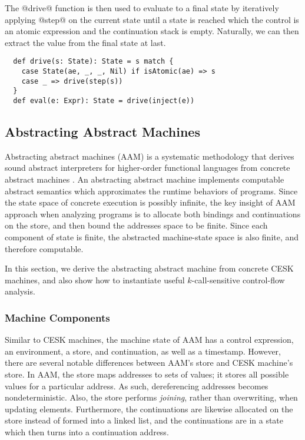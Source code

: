\documentclass[acmsmall, review]{acmart}\settopmatter{}
\begin{document}
The @drive@ function is then used to evaluate to a final state by iteratively applying 
@step@ on the current state until a state is reached which the control is an atomic 
expression and the continuation stack is empty. Naturally, we can then extract the value
from the final state at last.

\begin{lstlisting}
  def drive(s: State): State = s match {
    case State(ae, _, _, Nil) if isAtomic(ae) => s
    case _ => drive(step(s))
  }
  def eval(e: Expr): State = drive(inject(e))
\end{lstlisting}

\subsection{Abstracting Abstract Machines} \label{aam}
Abstracting abstract machines (AAM) is a systematic methodology that derives sound
abstract interpreters for higher-order functional languages from concrete abstract 
machines \cite{van2012systematic, van2010abstracting}. An abstracting abstract machine
implements computable abstract semantics which approximates the runtime behaviors of 
programs.
Since the state space of concrete execution is possibly infinite, the key insight of 
AAM approach when analyzing programs is to allocate both bindings and continuations 
on the store, and then bound the addresses space to be finite. Since each component
of state is finite, the abstracted machine-state space is also finite, and therefore
computable.

In this section, we derive the abstracting abstract machine from concrete
CESK machines, and also show how to instantiate useful $k$-call-sensitive 
control-flow analysis.

\subsubsection{Machine Components}

Similar to CESK machines, the machine state of AAM has a control expression,
an environment, a store, and continuation, as well as a timestamp.
However, there are several notable differences between AAM's store and CESK machine's store.
In AAM, the store maps addresses to sets of values; it stores all possible values
for a particular address. As such, dereferencing addresses becomes nondeterministic.
Also, the store performs \emph{joining}, rather than overwriting, when updating elements.
Furthermore, the continuations are likewise allocated on the store instead of formed into a
linked list, and the continuations are in a state which then turns into a continuation
address.
\end{document}
